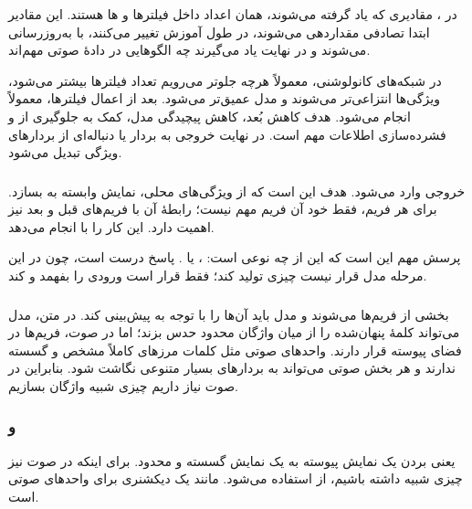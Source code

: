 در ، مقادیری که یاد گرفته می‌شوند، همان اعداد داخل فیلترها و ها هستند. این مقادیر ابتدا تصادفی مقداردهی می‌شوند، در طول آموزش تغییر می‌کنند، با  به‌روزرسانی می‌شوند و در نهایت یاد می‌گیرند چه الگوهایی در دادهٔ صوتی مهم‌اند.

در شبکه‌های کانولوشنی، معمولاً هرچه جلوتر می‌رویم تعداد فیلترها بیشتر می‌شود، ویژگی‌ها انتزاعی‌تر می‌شوند و مدل عمیق‌تر می‌شود. بعد از اعمال فیلترها، معمولاً  انجام می‌شود. هدف  کاهش بُعد، کاهش پیچیدگی مدل، کمک به جلوگیری از  و فشرده‌سازی اطلاعات مهم است. در نهایت خروجی  به بردار یا دنباله‌ای از بردارهای ویژگی تبدیل می‌شود.

\subsubsection{}
خروجی  وارد  می‌شود. هدف  این است که از ویژگی‌های محلی، نمایش وابسته به  بسازد. برای هر فریم، فقط خود آن فریم مهم نیست؛ رابطهٔ آن با فریم‌های قبل و بعد نیز اهمیت دارد.  این کار را با  انجام می‌دهد.

پرسش مهم این است که این  از چه نوعی است: ،  یا . پاسخ درست  است، چون در این مرحله مدل قرار نیست چیزی تولید کند؛ فقط قرار است ورودی را بفهمد و  کند.

\subsubsection{}
بخشی از فریم‌ها  می‌شوند و مدل باید آن‌ها را با توجه به  پیش‌بینی کند. در متن، مدل می‌تواند کلمهٔ پنهان‌شده را از میان واژگان محدود حدس بزند؛ اما در صوت، فریم‌ها در فضای پیوسته قرار دارند. واحدهای صوتی مثل کلمات مرزهای کاملاً مشخص و گسسته ندارند و هر بخش صوتی می‌تواند به بردارهای بسیار متنوعی نگاشت شود. بنابراین در صوت نیاز داریم چیزی شبیه واژگان بسازیم.

\subsubsection{ و }
 یعنی بردن یک نمایش پیوسته به یک نمایش گسسته و محدود. برای اینکه در صوت نیز چیزی شبیه  داشته باشیم، از  استفاده می‌شود.  مانند یک دیکشنری برای واحدهای صوتی است.


